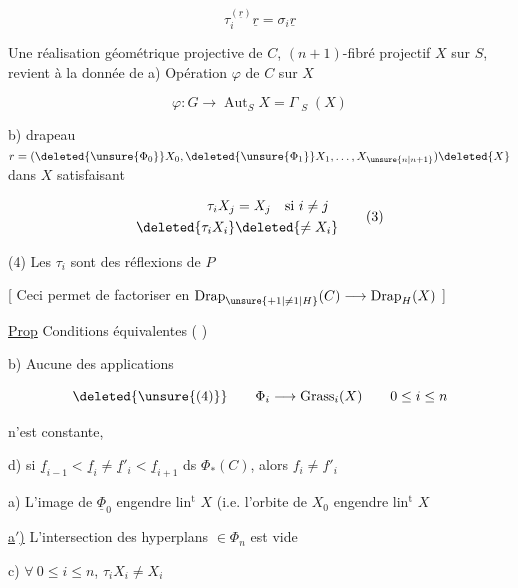 \[
\tau_i^{(\underline r)}\underline r=\sigma_i\underline r \tag*{(1)}
\]

Une réalisation géométrique projective de $C$,  $(n+1)$-fibré projectif $X$ sur $S$, revient à la donnée de a) Opération $\varphi$ de $C$ sur $X$

\[
\varphi:G\longrightarrow\operatorname{Aut}_S X=\Gamma\mathop{\underline{\operatorname{Aut}}}\nolimits_S(X)\tag*{(2)}
\]

b) drapeau  $r=(\deleted{\unsure{\Phi_0}}X_0,\deleted{\unsure{\Phi_1}}X_1,\ldots,X_{\unsure{n|n+1}})\deleted{X}$ dans $X$  satisfaisant

\[
\begin{aligned}
\tau_iX_j&=X_j\quad\text{si } i\ne j\\
\deleted{\tau_iX_i}&\deleted{\ne X_i}
\end{aligned}\tag*{(3)}
\]

(4) Les $\tau_i$ sont des réflexions de $P$

[ Ceci permet de  factoriser en $\operatorname{Drap}_{\unsure{+1|\ne1|H}}(C)\longrightarrow\operatorname{Drap}_{H}(X)$ ]

\uline{Prop} Conditions équivalentes (  )

b) Aucune des applications

\[
\deleted{\unsure{(4)}}\qquad \Phi_i\longrightarrow\operatorname{Grass}_i(X)\qquad 0\leq i\leq n
\]

n'est constante, 



d) si $\underline f_{i-1}<\underline f_i\ne\underline f'_i<\underline f_{i+1}$ ds $\Phi_*(C)$, alors $f_i\ne f'_i$

a) L'image de $\underline\Phi_0$ engendre lin$^{\mathrm t}$ $X$ (i.e. l'orbite de $X_0$ engendre lin$^{\mathrm t}$ $X$

\uline{a$'$)} L'intersection des hyperplans $\in\Phi_n$ est vide

 c) $\forall\ 0\leq i\leq n$, $\tau_iX_i\ne X_i$

